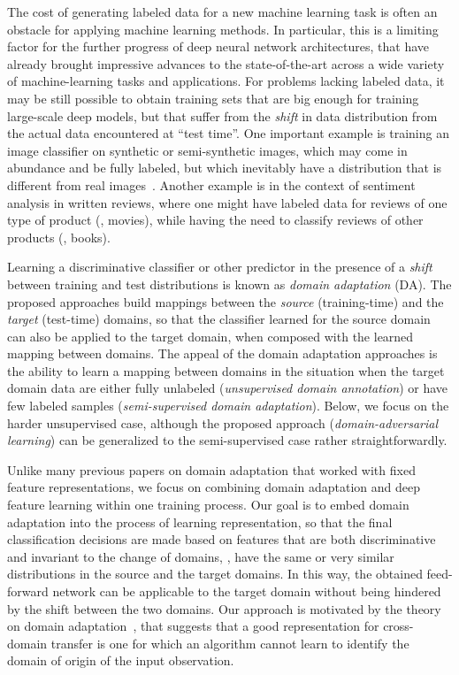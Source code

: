 \documentclass[twoside,11pt]{article}
\begin{document}
The cost of generating labeled data for a new machine learning task is
often an obstacle for applying machine learning methods. 
In particular, this is a limiting factor for the further progress of
deep neural network architectures, that have already brought impressive advances to the state-of-the-art across a wide variety of machine-learning tasks and applications. 
For problems lacking labeled data, it may be still possible to obtain training sets that are big enough for training large-scale deep models, but that suffer from the {\em shift} in data distribution from the actual data encountered at ``test time''. One  important example is training an image classifier on synthetic or semi-synthetic images, which may come in abundance and be fully labeled, but which inevitably have a distribution that is different from real images~\citep{Liebelt10,Stark10,Vazquez14,Sun14}.  Another example is in the context of sentiment analysis in written reviews, where one  might have labeled data for reviews of one type of product (\eg, movies), while having the need to classify reviews of other products (\eg, books).

Learning a discriminative classifier or other predictor in the presence of a {\em shift} between training and test distributions is known as {\em domain adaptation} (DA).
The proposed approaches build mappings between the {\em source} (training-time) and the {\em target} (test-time) domains, so that the classifier learned for the source domain can also be applied to the target domain, when composed with the learned mapping between domains. The appeal of the domain adaptation approaches is the ability to learn a mapping between domains in the situation when the target domain data are either fully unlabeled ({\em unsupervised domain annotation}) or have few labeled samples ({\em semi-supervised domain adaptation}). Below, we focus on the harder unsupervised case, although the proposed approach (\textit{domain-adversarial learning}) can be generalized to the semi-supervised case rather straightforwardly.

Unlike many previous papers on domain adaptation that worked with fixed feature representations, we focus on combining domain adaptation and deep feature learning within one training process. Our goal is to embed domain adaptation into the process of learning representation, so that the final classification decisions are made based on features that are both discriminative and invariant to the change of domains, \ie, have the same or very similar distributions in the source and the target domains. In this way, the obtained feed-forward network can be applicable to the target domain without being hindered by the shift between the two domains.  Our approach is motivated by the theory on domain
adaptation~\citep{BenDavid-NIPS06,BenDavid-MLJ2010}, that suggests that
a good representation for cross-domain transfer is one for which an algorithm cannot learn to identify the domain of origin of the input observation.
\end{document}
